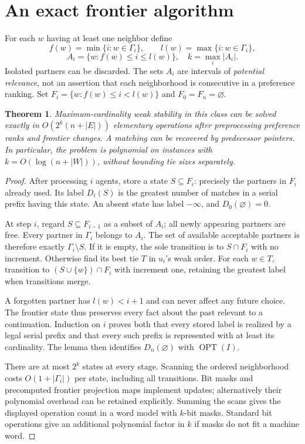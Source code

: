 \documentclass[11pt]{article}
\newtheorem{theorem}{Theorem}
\theoremstyle{definition}
\begin{document}
\section*{An exact frontier algorithm}
For each $w$ having at least one neighbor define
\[
 f(w)=\min\{i:w\in\Gamma_i\},\qquad
 l(w)=\max\{i:w\in\Gamma_i\},
\]
\[
 A_i=\{w:f(w)\le i\le l(w)\},\quad
 k=\max_i|A_i|.
\]
Isolated partners can be discarded. The sets $A_i$ are intervals of
\emph{potential relevance}, not an assertion that each neighborhood is
consecutive in a preference ranking. Set
$F_i=\{w:f(w)\le i<l(w)\}$ and $F_0=F_n=\varnothing$.

\begin{theorem}
Maximum-cardinality weak stability in this class can be solved exactly in
$O(2^k(n+|E|))$ elementary operations after preprocessing preference ranks
and frontier changes. A matching can be recovered by predecessor pointers.
In particular, the problem is polynomial on instances with
$k=O(\log(n+|W|))$, without bounding tie sizes separately.
\end{theorem}
\begin{proof}
After processing $i$ agents, store a state $S\subseteq F_i$: precisely the
partners in $F_i$ already used. Its label $D_i(S)$ is the greatest number
of matches in a serial prefix having this state. An absent state has label
$-\infty$, and $D_0(\varnothing)=0$.

At step $i$, regard $S\subseteq F_{i-1}$ as a subset of $A_i$; all newly
appearing partners are free. Every partner in $\Gamma_i$ belongs to $A_i$.
The set of available acceptable partners is therefore exactly
$\Gamma_i\setminus S$. If it is empty, the sole transition is to
$S\cap F_i$ with no increment. Otherwise find its best tie $T$ in $u_i$'s
weak order. For each $w\in T$, transition to
$(S\cup\{w\})\cap F_i$ with increment one, retaining the greatest label
when transitions merge.

A forgotten partner has $l(w)<i+1$ and can never affect any future choice.
The frontier state thus preserves every fact about the past relevant to a
continuation. Induction on $i$ proves both that every stored label is
realized by a legal serial prefix and that every such prefix is represented
with at least its cardinality. The lemma then identifies
$D_n(\varnothing)$ with $\operatorname{OPT}(I)$.

There are at most $2^k$ states at every stage. Scanning the ordered
neighborhood costs $O(1+|\Gamma_i|)$ per state, including all transitions.
Bit masks and precomputed frontier projection maps implement updates;
alternatively their polynomial overhead can be retained explicitly.
Summing the scans gives the displayed operation count in a word model
with $k$-bit masks. Standard bit operations give an additional polynomial
factor in $k$ if masks do not fit a machine word.
\end{proof}
\end{document}
